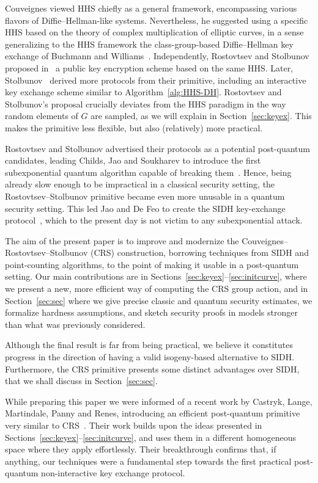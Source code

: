 \documentclass{llncs}
\begin{document}
Couveignes viewed HHS chiefly as a general framework, encompassing
various flavors of Diffie--Hellman-like systems. Nevertheless, he
suggested using a specific HHS based on the theory of complex
multiplication of elliptic curves, in a sense generalizing to the HHS
framework the class-group-based Diffie--Hellman key exchange of
Buchmann and Williams~\cite{Buchmann1988}. Independently, Rostovtsev
and Stolbunov proposed in~\cite{rostovtsev+stolbunov06} a public key
encryption scheme based on the same HHS. Later, Stolbunov~\cite{Stol}
derived more protocols from their primitive, including an interactive
key exchange scheme similar to Algorithm~\ref{alg:HHS-DH}.  Rostovtsev
and Stolbunov's proposal crucially deviates from the HHS paradigm in
the way random elements of $G$ are sampled, as we will explain in
Section~\ref{sec:keyex}. This makes the primitive less flexible, but
also (relatively) more practical.

Rostovtsev and Stolbunov advertised their protocols as a potential
post-quantum candidates, leading Childs, Jao and Soukharev to introduce
the first subexponential quantum algorithm capable of breaking
them~\cite{childs2014constructing}. Hence, being already slow enough to
be impractical in a classical security setting, the
Rostovtsev--Stolbunov primitive became even more unusable in a quantum
security setting. This led Jao and De Feo to create the SIDH
key-exchange protocol~\cite{jao+defeo2011}, which to the present day
is not victim to any subexponential attack.

The aim of the present paper is to improve and modernize the
Couveignes--Rostovtsev--Stolbunov (CRS) construction, borrowing
techniques from SIDH and point-counting algorithms, to the point of
making it usable in a post-quantum setting.  Our main contributions
are in Sections~\ref{sec:keyex}--\ref{sec:initcurve}, where we present
a new, more efficient way of computing the CRS group action, and in
Section~\ref{sec:sec} where we give precise classic and quantum
security estimates, we formalize hardness assumptions, and sketch
security proofs in models stronger than what was previously
considered.

Although the final result is far from being practical, we believe it
constitutes progress in the direction of having a valid isogeny-based
alternative to SIDH.  Furthermore, the CRS primitive presents some
distinct advantages over SIDH, that we shall discuss in
Section~\ref{sec:sec}. 

While preparing this paper we were informed of
a recent work by Castryk, Lange, Martindale, Panny and Renes,
introducing an efficient post-quantum primitive very similar to
CRS~\cite{csidh}.  Their work builds upon the ideas presented in
Sections~\ref{sec:keyex}--\ref{sec:initcurve}, and uses them in a
different homogeneous space where they apply effortlessly.  Their
breakthrough confirms that, if anything, our techniques were a
fundamental step towards the first practical post-quantum
non-interactive key exchange protocol.
\end{document}

